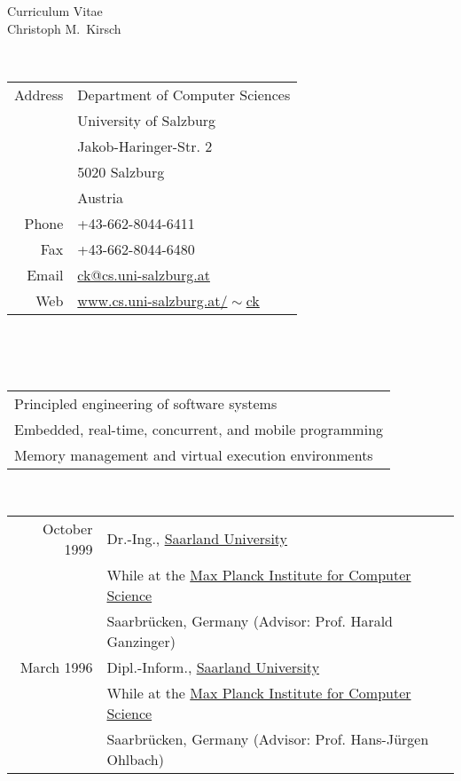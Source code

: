 \thispagestyle{empty}

\begin{center}
  {\sc \Huge Curriculum Vitae}\\ \vspace{10mm}
  {\sc \Large Christoph M.~Kirsch}\\ \vspace{12mm}
\end{center} \vfill

 \\
\begin{tabular}{rl}
Address & Department of Computer Sciences\\
        & University of Salzburg\\
        & Jakob-Haringer-Str. 2\\
        & 5020 Salzburg\\
        & Austria\\
\noalign{\smallskip}
Phone   & +43-662-8044-6411\\
Fax     & +43-662-8044-6480\\
Email   & \href{mailto:ck@cs.uni-salzburg.at}{ck@cs.uni-salzburg.at} \\
Web     & \href{http://www.cs.uni-salzburg.at/~ck}{www.cs.uni-salzburg.at/$\!\sim$ck} \\
\end{tabular} \\ \vfill

 \\
\begin{tabular}{l}
Principled engineering of software systems \\
\noalign{\smallskip}
Embedded, real-time, concurrent, and mobile programming \\
\noalign{\smallskip}
Memory management and virtual execution environments
\end{tabular} \vfill

 \\
\begin{tabular}{rl}
October 1999 & Dr.-Ing., \href{http://www.uni-saarland.de}{Saarland University} \\
             & While at the \href{http://www.mpi-sb.mpg.de}{Max Planck Institute for Computer Science} \\
             & Saarbr{\"u}cken, Germany (Advisor: Prof. Harald Ganzinger)\\
\noalign{\smallskip}
March 1996 & Dipl.-Inform., \href{http://www.uni-saarland.de}{Saarland University} \\
           & While at the \href{http://www.mpi-sb.mpg.de}{Max Planck Institute for Computer Science} \\
           & Saarbr{\"u}cken, Germany (Advisor: Prof. Hans-J{\"u}rgen Ohlbach)\\
\end{tabular} \\ \vfill

